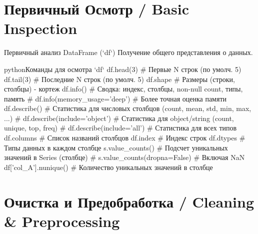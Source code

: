 \section{Первичный Осмотр / Basic Inspection}

\begin{textbox}{Первичный анализ DataFrame (`df`)}
Получение общего представления о данных.
\begin{codebox}{python}{Команды для осмотра `df`}
df.head(3)      # Первые N строк (по умолч. 5)
df.tail(3)      # Последние N строк (по умолч. 5)
df.shape        # Размеры (строки, столбцы) - кортеж
df.info()       # Сводка: индекс, столбцы, non-null count, типы, память
# df.info(memory_usage='deep') # Более точная оценка памяти
df.describe()   # Статистика для числовых столбцов (count, mean, std, min, max, ...)
# df.describe(include='object') # Статистика для object/string (count, unique, top, freq)
# df.describe(include='all') # Статистика для всех типов
df.columns      # Список названий столбцов
df.index        # Индекс строк
df.dtypes       # Типы данных в каждом столбце
s.value_counts() # Подсчет уникальных значений в Series (столбце)
# s.value_counts(dropna=False) # Включая NaN
df['col_A'].nunique() # Количество уникальных значений в столбце
\end{codebox}
\end{textbox}

\section{Очистка и Предобработка / Cleaning \& Preprocessing}

